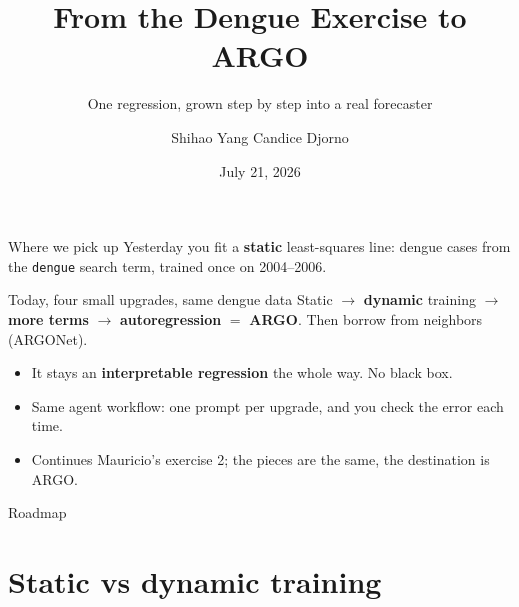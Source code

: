 \documentclass[aspectratio=169,11pt]{beamer}
\title{From the Dengue Exercise to ARGO}
\subtitle{One regression, grown step by step into a real forecaster}
\author{Shihao Yang \quad\textbullet\quad Candice Djorno}
\institute{SISMID 2026 \textbullet\ Day 2, 1:30}
\date{July 21, 2026}
\begin{document}
\begin{frame}
  \titlepage
\end{frame}

\begin{frame}{Where we pick up}
  Yesterday you fit a \textbf{static} least-squares line: dengue cases from the
  \texttt{dengue} search term, trained once on 2004--2006.
  \begin{block}{Today, four small upgrades, same dengue data}
    Static $\to$ \textbf{dynamic} training $\to$ \textbf{more terms} $\to$
    \textbf{autoregression} $=$ \textbf{ARGO}. Then borrow from neighbors (ARGONet).
  \end{block}
  \vspace{0.3em}
  \begin{itemize}
    \item It stays an \textbf{interpretable regression} the whole way. No black box.
    \item Same agent workflow: one prompt per upgrade, and you check the error each time.
    \item Continues Mauricio's exercise 2; the pieces are the same, the destination is ARGO.
  \end{itemize}
\end{frame}

\begin{frame}{Roadmap}
  \tableofcontents
\end{frame}

\section{Static vs dynamic training}
\end{document}

